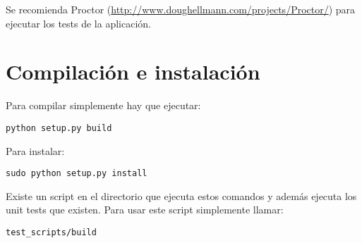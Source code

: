 Se recomienda Proctor (\url{http://www.doughellmann.com/projects/Proctor/}) para ejecutar los tests de la aplicación.

\section{Compilación e instalación}

Para compilar simplemente hay que ejecutar:

\begin{verbatim}
python setup.py build
\end{verbatim}

Para instalar:

\begin{verbatim}
sudo python setup.py install
\end{verbatim}

Existe un script en el directorio  que ejecuta estos comandos y además ejecuta los unit tests que existen. Para usar este script simplemente llamar:

\begin{verbatim}
test_scripts/build
\end{verbatim}



